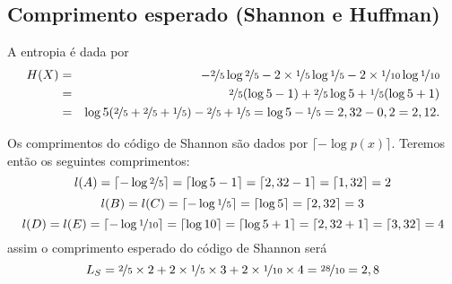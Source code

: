 \subsection{Comprimento esperado (Shannon e Huffman)}

\begin{questions}

\begin{solution}
    A entropia é dada por
    \begin{eqnarray}
    H(X) &=& - \nicefrac{2}{5} \log \nicefrac{2}{5} - 2\times \nicefrac{1}{5} \log \nicefrac{1}{5} - 2 \times \nicefrac{1}{10} \log \nicefrac{1}{10} \\
                &=& \nicefrac{2}{5} (\log 5 - 1) + \nicefrac{2}{5} \log 5 + \nicefrac{1}{5} (\log 5 + 1) \\
                        &=& \log 5 (\nicefrac{2}{5} + \nicefrac{2}{5} + \nicefrac{1}{5}) - \nicefrac{2}{5} + \nicefrac{1}{5} = \log 5 - \nicefrac{1}{5} = 2,32 - 0,2 = 2,12 .
    \end{eqnarray}
    
    Os comprimentos do código de Shannon são dados por $\lceil - \log p(x) \rceil$.
    Teremos então os seguintes comprimentos:
    \begin{equation}
    l(A) = \lceil - \log \nicefrac{2}{5} \rceil = \lceil \log 5 - 1 \rceil = \lceil 2,32 - 1 \rceil = \lceil 1,32 \rceil = 2
    \end{equation}
    \begin{equation}
    l(B) = l(C) = \lceil - \log \nicefrac{1}{5} \rceil = \lceil \log 5 \rceil = \lceil 2,32  \rceil = 3
    \end{equation}
    \begin{equation}
    l(D) = l(E) = \lceil - \log \nicefrac{1}{10} \rceil = \lceil \log 10 \rceil = \lceil \log 5 + 1 \rceil = \lceil 2,32 + 1 \rceil = \lceil 3,32 \rceil = 4
    \end{equation}
    assim o comprimento esperado do código de Shannon será
    \begin{equation}
    L_S = \nicefrac{2}{5} \times 2 + 2 \times \nicefrac{1}{5} \times 3 + 2 \times \nicefrac{1}{10} \times 4 = \nicefrac{28}{10} = 2,8
    \end{equation}


\end{solution}
\end{questions}
